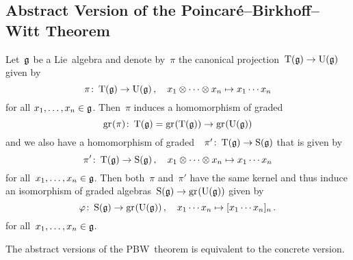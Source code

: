 \subsection{Abstract Version of the Poincar\'{e}--Birkhoff--Witt Theorem}


\begin{theorem}
  \label{pbw abstract}
  Let~$\mathfrak{g}$ be a Lie~algebra and denote by~$\pi$ the canonical projection~$\operatorname{T}(\mathfrak{g}) \to \operatorname{U}(\mathfrak{g})$ given by
  \[
    \pi
    \colon
    \operatorname{T}(\mathfrak{g})
    \to
    \operatorname{U}(\mathfrak{g}) \,,
    \quad
    x_1 \otimes \dotsb \otimes x_n
    \mapsto
    x_1 \dotsm x_n
  \]
  for all $x_1, \dotsc, x_n \in \mathfrak{g}$.
  Then~$\pi$ induces a homomorphism of graded~{\algebras{$\kf$}}
  \[
    \gr(\pi)
    \colon
    \Tensor(\glie)
    =
    \gr(\Tensor(\glie))
    \to
    \gr(\Univ(\glie))
  \]
  and we also have a homomorphism of graded~{\algebras{$\kf$}}~$\pi' \colon \operatorname{T}(\mathfrak{g}) \to \operatorname{S}(\mathfrak{g})$ that  is given by
  \[
    \pi'
    \colon
    \operatorname{T}(\mathfrak{g})
    \to
    \operatorname{S}(\mathfrak{g}) \,,
    \quad
    x_1 \otimes \dotsb \otimes x_n
    \mapsto
    x_1 \dotsm x_n
  \]
  for all~$x_1, \dotsc, x_n \in \mathfrak{g}$.
  Then both~$\pi$ and~$\pi'$ have the same kernel and thus induce an isomorphism of graded algebras~$\Symm(\glie) \to \gr(\Univ(\glie))$ given by
  \begin{equation}
    \label{definition of abstract pbw isomorphism}
    \varphi
    \colon
    \Symm(\glie)
    \to
    \gr(\Univ(\glie)) \,,
    \quad
    x_1 \dotsm x_n
    \mapsto
    [x_1 \dotsm x_n]_n \,.
  \end{equation}
  for all~$x_1, \dotsc, x_n \in \mathfrak{g}$.
\end{theorem}


\begin{proposition}
  The abstract versions of the PBW~theorem is equivalent to the concrete version.
\end{proposition}


